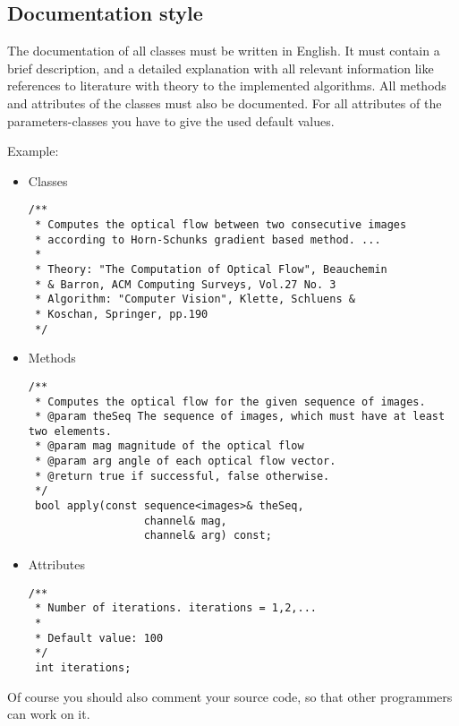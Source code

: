 \subsection{Documentation style}

The documentation of all classes must be written in English.  It must contain
a brief description, and a detailed explanation with all relevant information
like references to literature with theory to the implemented
algorithms.  All methods and attributes of the classes must also be
documented.  For all attributes of the parameters-classes you have to give the
used default values.

Example:

\begin{itemize}

\item Classes
\begin{verbatim}
/**
 * Computes the optical flow between two consecutive images
 * according to Horn-Schunks gradient based method. ...
 *
 * Theory: "The Computation of Optical Flow", Beauchemin
 * & Barron, ACM Computing Surveys, Vol.27 No. 3
 * Algorithm: "Computer Vision", Klette, Schluens &
 * Koschan, Springer, pp.190
 */
\end{verbatim}
\item Methods
\begin{verbatim}
/**
 * Computes the optical flow for the given sequence of images.
 * @param theSeq The sequence of images, which must have at least two elements.
 * @param mag magnitude of the optical flow
 * @param arg angle of each optical flow vector.
 * @return true if successful, false otherwise.
 */
 bool apply(const sequence<images>& theSeq,
                  channel& mag,
                  channel& arg) const;
\end{verbatim}
\item Attributes
\begin{verbatim}
/**
 * Number of iterations. iterations = 1,2,... 
 *
 * Default value: 100
 */
 int iterations;
\end{verbatim}
\end{itemize}

Of course you should also comment your source code, so that other programmers
can work on it.

